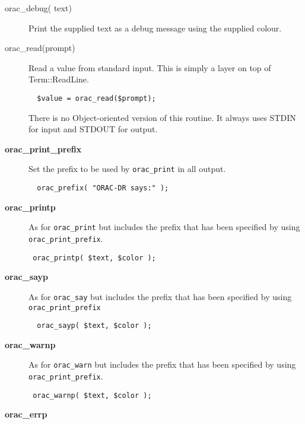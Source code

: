 \begin{description}
\begin{description}
\item[{orac\_debug( text)}] \mbox{}

Print the supplied text as a debug message using the supplied
colour.


\item[{orac\_read(prompt)}] \mbox{}

Read a value from standard input. This is simply a layer
on top of Term::ReadLine.

\begin{verbatim}
  $value = orac_read($prompt);
\end{verbatim}


There is no Object-oriented version of this routine. It always
uses STDIN for input and STDOUT for output.


\item[{\textbf{orac\_print\_prefix}}] \mbox{}

Set the prefix to be used by \texttt{orac\_print} in all output.

\begin{verbatim}
  orac_prefix( "ORAC-DR says:" );
\end{verbatim}

\item[{\textbf{orac\_printp}}] \mbox{}

As for \texttt{orac\_print} but includes the prefix that has been specified
by using \texttt{orac\_print\_prefix}.

\begin{verbatim}
 orac_printp( $text, $color );
\end{verbatim}

\item[{\textbf{orac\_sayp}}] \mbox{}

As for \texttt{orac\_say} but includes the prefix that has been specified by using \texttt{orac\_print\_prefix}

\begin{verbatim}
  orac_sayp( $text, $color );
\end{verbatim}

\item[{\textbf{orac\_warnp}}] \mbox{}

As for \texttt{orac\_warn} but includes the prefix that has been specified
by using \texttt{orac\_print\_prefix}.

\begin{verbatim}
 orac_warnp( $text, $color );
\end{verbatim}

\item[{\textbf{orac\_errp}}] \mbox{}


\end{description}
\end{description}

